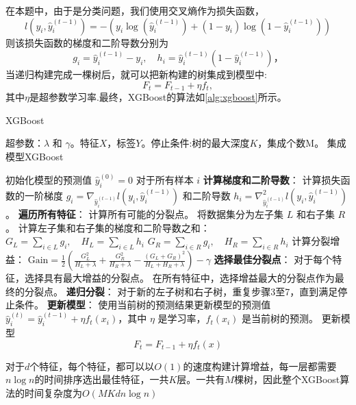 在本题中，由于是分类问题，我们使用交叉熵作为损失函数，
\begin{equation}
	l(y_i,\hat{y}_i^{(t-1)})=-\left(y_i\log(\hat{y}_i^{(t-1)})+(1-y_i)\log(1-\hat{y}_i^{(t-1)})\right)
\end{equation}
则该损失函数的梯度和二阶导数分别为
\begin{equation}
	g_i=\hat{y}_i^{(t-1)}-y_i ,\quad h_i=\hat{y}_i^{(t-1)}(1-\hat{y}_i^{(t-1)})，
\end{equation}
当递归构建完成一棵树后，就可以把新构建的树集成到模型中:
\begin{equation}
	F_t=F_{t-1}+\eta f_t,
\end{equation}
其中$\eta$是超参数学习率.最终，XGBoost的算法如\autoref{alg:xgboost}所示。
\begin{breakablealgorithm}
	\caption{XGBoost}
	\label{alg:xgboost}
	\begin{algorithmic}[1]
		\REQUIRE 超参数：$\lambda$ 和 $\gamma$。特征$X$，标签$Y$。停止条件:树的最大深度$K$，集成个数M。
		\ENSURE 集成模型XGBoost

		\STATE 初始化模型的预测值 $\hat{y}_i^{(0)} = 0$ 对于所有样本 $i$
		    \STATE \textbf{计算梯度和二阶导数}：
		        \STATE 计算损失函数的一阶梯度 $g_i = \nabla_{\hat{y}_i^{(t-1)}} l(y_i, \hat{y}_i^{(t-1)})$ 和二阶导数 $h_i = \nabla_{\hat{y}_i^{(t-1)}}^2 l(y_i, \hat{y}_i^{(t-1)})$。
		    \ENDFOR
		    \STATE \textbf{遍历所有特征}：
		        \STATE 计算所有可能的分裂点。
		            \STATE 将数据集分为左子集 $L$ 和右子集 $R$。
		            \STATE 计算左子集和右子集的梯度和二阶导数之和：
		            \STATE $G_L = \sum_{i \in L} g_i, \quad H_L = \sum_{i \in L} h_i$
		            \STATE $G_R = \sum_{i \in R} g_i, \quad H_R = \sum_{i \in R} h_i$
		            \STATE 计算分裂增益：
		            \STATE $\text{Gain} = \frac{1}{2}\left(\frac{G_L^2}{H_L + \lambda} + \frac{G_R^2}{H_R + \lambda} - \frac{(G_L + G_R)^2}{H_L + H_R + \lambda}\right) - \gamma$
		        \ENDFOR
		    \ENDFOR
		    \STATE \textbf{选择最佳分裂点}：
		    \STATE 对于每个特征，选择具有最大增益的分裂点。
		    \STATE 在所有特征中，选择增益最大的分裂点作为最终的分裂点。
		    \STATE \textbf{递归分裂}：
		    \STATE 对于新的左子树和右子树，重复步骤3至7，直到满足停止条件。
		    \STATE \textbf{更新模型}：
		    \STATE 使用当前树的预测结果更新模型的预测值 $\hat{y}_i^{(t)} = \hat{y}_i^{(t-1)} + \eta f_t(x_i)$，其中 $\eta$ 是学习率，$f_t(x_i)$ 是当前树的预测。
			\STATE 更新模型
		     \[
			 F_t=F_{t-1}+\eta f_t(x)
			 \]
		\ENDFOR
		\RETURN
	\end{algorithmic}
\end{breakablealgorithm}
\par
对于$d$个特征，每个特征，都可以以$O(1)$的速度构建计算增益，每一层都需要$n\log n$的时间排序选出最佳特征，一共$K$层。一共有$M$棵树，因此整个XGBoost算法的时间复杂度为$O(MKdn\log{n})$
\vspace*{1cm}

